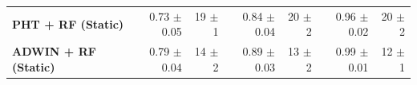 \begin{table}[t]
\begin{tabular}{@{}lrrrrrr@{}}
    \midrule
    \textbf{PHT + RF (Static)}                     & 0.73 {\small $\pm$0.05}                   & 19 {\small $\pm$1}                              & 0.84 {\small $\pm$0.04}                          & 20 {\small $\pm$2} & 0.96 {\small $\pm$0.02} & 20 {\small $\pm$2} \\
    \textbf{ADWIN + RF (Static)}                   & 0.79 {\small $\pm$0.04}                   & 14 {\small $\pm$2}                              & 0.89 {\small $\pm$0.03}                          & 13 {\small $\pm$2} & 0.99 {\small $\pm$0.01} & 12 {\small $\pm$1} \\
    \bottomrule
  \end{tabular}
\end{table}

